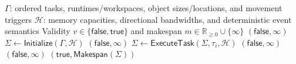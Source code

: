 \documentclass[10pt]{article}
\begin{document}
\begin{algorithm}[H]
\caption{Event-driven simulation subroutine}
\label{alg:simulate}
\small
\begin{algorithmic}[1]
\Require $\Gamma$: ordered tasks, runtimes/workspaces, object sizes/locations, and movement triggers
\Statex \hspace{\algorithmicindent}$\mathcal H$: memory capacities,
  directional bandwidths, and deterministic event semantics
\Ensure Validity $v\in\{\mathsf{false},\mathsf{true}\}$ and makespan
  $m\in\mathbb R_{\ge 0}\cup\{\infty\}$
  \State \Return $(\mathsf{false},\infty)$ 
\EndIf
\State $\Sigma\gets\mathsf{Initialize}(\Gamma,\mathcal H)$
      \State \Return $(\mathsf{false},\infty)$
    \EndIf
  \EndWhile
  \State $\Sigma\gets\mathsf{ExecuteTask}(\Sigma,\tau_i,\mathcal H)$
\EndFor
{}
    \State \Return $(\mathsf{false},\infty)$
  \EndIf
\EndWhile
{}
  \State \Return $(\mathsf{false},\infty)$
\EndIf
\State \Return $(\mathsf{true},\mathsf{Makespan}(\Sigma))$
\end{algorithmic}
\end{algorithm}
\end{document}
